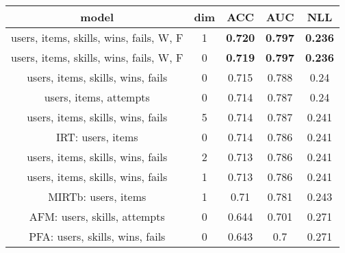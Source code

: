 \begin{tabular}{ccccc}
\toprule
                                  model &  dim &             ACC &             AUC &             NLL \\
\midrule
 users, items, skills, wins, fails, W, F &  1 &  \textbf{0.720} &  \textbf{0.797} &  \textbf{0.236} \\
 users, items, skills, wins, fails, W, F &  0 &  \textbf{0.719} &  \textbf{0.797} &  \textbf{0.236} \\
 users, items, skills, wins, fails &  0 &  0.715 &  0.788 &  0.24 \\
 users, items, attempts &  0 &  0.714 &  0.787 &  0.24 \\
 users, items, skills, wins, fails &  5 &  0.714 &  0.787 &  0.241 \\
 IRT: users, items &  0 &  0.714 &  0.786 &  0.241 \\
 users, items, skills, wins, fails &  2 &  0.713 &  0.786 &  0.241 \\
 users, items, skills, wins, fails &  1 &  0.713 &  0.786 &  0.241 \\
 MIRTb: users, items &  1 &  0.71 &  0.781 &  0.243 \\
 AFM: users, skills, attempts &  0 &  0.644 &  0.701 &  0.271 \\
 PFA: users, skills, wins, fails &  0 &  0.643 &  0.7 &  0.271 \\
\bottomrule
\end{tabular}

